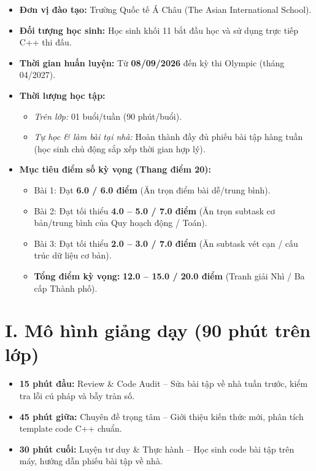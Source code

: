 \documentclass[11pt,a4paper]{article}
\begin{document}
\begin{tcolorbox}[colback=AsianLightBlue,colframe=AsianBlue,title=\textbf{THÔNG TIN CHUNG}]
\begin{itemize}
    \item \textbf{Đơn vị đào tạo:} Trường Quốc tế Á Châu (The Asian International School).
    \item \textbf{Đối tượng học sinh:} Học sinh khối 11 bắt đầu học và sử dụng trực tiếp C++ thi đấu.
    \item \textbf{Thời gian huấn luyện:} Từ \textbf{08/09/2026} đến kỳ thi Olympic (tháng 04/2027).
    \item \textbf{Thời lượng học tập:}
    \begin{itemize}
        \item \textit{Trên lớp:} 01 buổi/tuần (90 phút/buổi).
        \item \textit{Tự học \& làm bài tại nhà:} Hoàn thành đầy đủ phiếu bài tập hàng tuần (học sinh chủ động sắp xếp thời gian hợp lý).
    \end{itemize}
    \item \textbf{Mục tiêu điểm số kỳ vọng (Thang điểm 20):}
    \begin{itemize}
        \item Bài 1: Đạt \textbf{6.0 / 6.0 điểm} (Ăn trọn điểm bài dễ/trung bình).
        \item Bài 2: Đạt tối thiểu \textbf{4.0 -- 5.0 / 7.0 điểm} (Ăn trọn subtask cơ bản/trung bình của Quy hoạch động / Toán).
        \item Bài 3: Đạt tối thiểu \textbf{2.0 -- 3.0 / 7.0 điểm} (Ăn subtask vét cạn / cấu trúc dữ liệu cơ bản).
        \item \textbf{Tổng điểm kỳ vọng:} \textbf{12.0 -- 15.0 / 20.0 điểm} (Tranh giải Nhì / Ba cấp Thành phố).
    \end{itemize}
\end{itemize}
\end{tcolorbox}

\section*{\color{AsianDarkBlue}I. Mô hình giảng dạy (90 phút trên lớp)}
\begin{itemize}
    \item \textbf{15 phút đầu:} Review \& Code Audit -- Sửa bài tập về nhà tuần trước, kiểm tra lỗi cú pháp và bẫy tràn số.
    \item \textbf{45 phút giữa:} Chuyên đề trọng tâm -- Giới thiệu kiến thức mới, phân tích template code C++ chuẩn.
    \item \textbf{30 phút cuối:} Luyện tư duy \& Thực hành -- Học sinh code bài tập trên máy, hướng dẫn phiếu bài tập về nhà.
\end{itemize}
\end{document}
